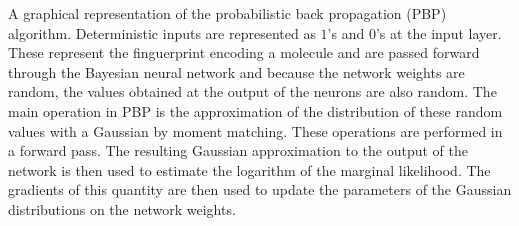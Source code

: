 A graphical representation of the probabilistic back propagation (PBP)
algorithm. Deterministic inputs are represented as $1$'s and $0$'s at the input
layer. These represent the finguerprint encoding a molecule and are passed forward through the Bayesian neural network and because
the network weights are random, the values obtained at the output of the
neurons are also random. The main operation in PBP is the approximation of the
distribution of these random values with a Gaussian by moment matching. These
operations are performed in a forward pass. The resulting Gaussian
approximation to the output of the network is then used to estimate the
logarithm of the marginal likelihood. The gradients of this quantity are then
used to update the parameters of the Gaussian distributions on the network
weights.
